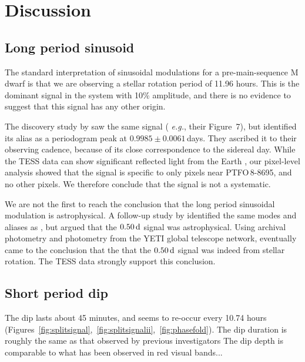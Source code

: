 \documentclass[12pt,twocolumn,tighten]{aastex62}
\newcommand{\ptfo}{PTFO$\,$8-8695}
\begin{document}
\section{Discussion}
\label{sec:discussion}

\subsection{Long period sinusoid}

The standard interpretation of sinusoidal modulations for a pre-main-sequence M
dwarf is that we are observing a stellar rotation period of 11.96 hours.  This
is the dominant signal in the system with 10\% amplitude, and there is no
evidence to suggest that this signal has any other origin.

The discovery study by \citet{van_eyken_ptf_2012} saw the same signal ({\it
e.g.}, their Figure~7), but identified its alias as a periodogram peak at
$0.9985 \pm 0.0061\,$days. They ascribed it to their observing cadence, because
of its close correspondence to the sidereal day.  While the TESS data can show
significant reflected light from the Earth \citep[{\it
e.g.},][]{luger_tess_2019}, our pixel-level analysis showed that the signal is
specific to only pixels near \ptfo, and no other pixels.  We therefore conclude
that the signal is not a systematic.

We are not the first to reach the conclusion that the long period sinusoidal
modulation is astrophysical.  A follow-up study by
\citet{koen_multicolour_2015} identified the same modes and aliases as
\citet{van_eyken_ptf_2012}, but argued that the $0.50\,{\rm d}$ signal was
astrophysical.  Using archival photometry and photometry from the YETI global
telescope network, \citet{raetz_yeti_2016} eventually came to the conclusion
that the that the $0.50\,{\rm d}$ signal was indeed from stellar rotation.  The
TESS data strongly support this conclusion.



\subsection{Short period dip}
The dip lasts about 45 minutes, and seems to re-occur every 10.74
hours
(Figures~\ref{fig:splitsignal},~\ref{fig:splitsignalii},~\ref{fig:phasefold}).
The dip duration is roughly the same as that observed by previous
investigators \citep{van_eyken_ptf_2012,yu_tests_2015}
The dip depth is comparable to what has been observed in red visual
bands...
\end{document}
